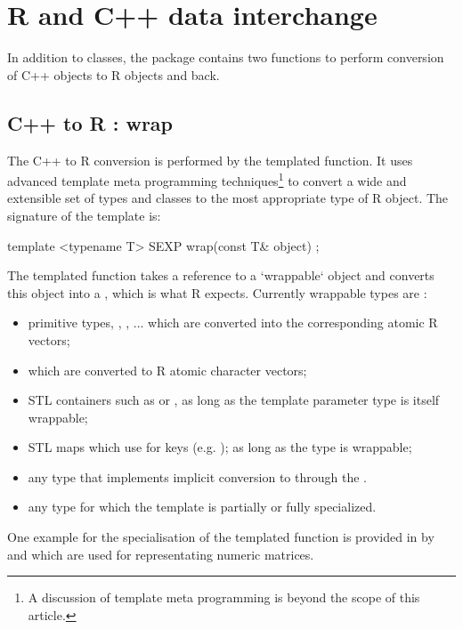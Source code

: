 \section{R and C++ data interchange}

In addition to classes, the  package contains two 
functions to perform conversion of C++ objects to R objects and back. 

\subsection{C++ to R : wrap}

The C++ to R conversion is performed by the  templated
function. It uses advanced template meta programming techniques\footnote{A
  discussion of template meta programming is beyond the scope of this
  article.}  to convert a wide and extensible set of types and classes to the
most appropriate type of R object. The signature of the  template
is:

\begin{example}
template <typename T> 
SEXP wrap(const T& object) ;
\end{example}

The templated function takes a reference to a `wrappable` 
object and converts this object into a , which is what R expects. 
Currently wrappable types are :
\begin{itemize}
\item primitive types, , , ... which are converted 
into the corresponding atomic R vectors;
\item {} which are converted to R atomic character vectors;
\item STL containers such as  or , 
as long as the template parameter type  is itself wrappable;
\item STL maps which use  for keys 
(e.g. ); as long as 
the type  is wrappable;
\item any type that implements implicit conversion to  through the 
.
\item any type for which the  template is partially or fully 
specialized.
\end{itemize}
One example for the specialisation of the templated  function is
provided in  \citep{cran:rinside} by  and  which are used for
representating numeric matrices.

